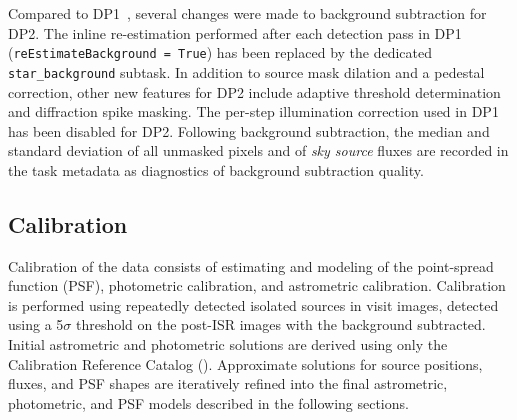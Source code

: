 
Compared to DP1~\citep[][]{10.71929/rubin/2570308}, several changes were made to background subtraction for DP2\@.
The inline re-estimation performed after each detection pass in \gls{DP1} (\texttt{reEstimateBackground = True}) has been replaced by the dedicated \texttt{star\_background} subtask.
In addition to source mask dilation and a pedestal correction, other new features for \gls{DP2} include adaptive threshold determination and diffraction spike masking.
The per-step illumination correction used in \gls{DP1} has been disabled for \gls{DP2}.  %
Following \gls{background} subtraction, the median and standard deviation of all unmasked pixels and of \textit{sky source} fluxes are recorded in the task \gls{metadata} as diagnostics of \gls{background} subtraction quality.

\subsection{Calibration} \label{sec:drp-calibration}

Calibration of the data consists of estimating and modeling of the point-spread function (PSF), photometric \gls{calibration}, and astrometric \gls{calibration}.
Calibration is performed using repeatedly detected isolated sources in visit images, detected using a 5$\sigma$ threshold on the post-\gls{ISR} images with the background subtracted.
Initial astrometric and photometric solutions are derived using only the Calibration Reference Catalog ().
Approximate solutions for source positions, fluxes, and PSF shapes are iteratively refined into the final astrometric, photometric, and PSF models described in the following sections.

